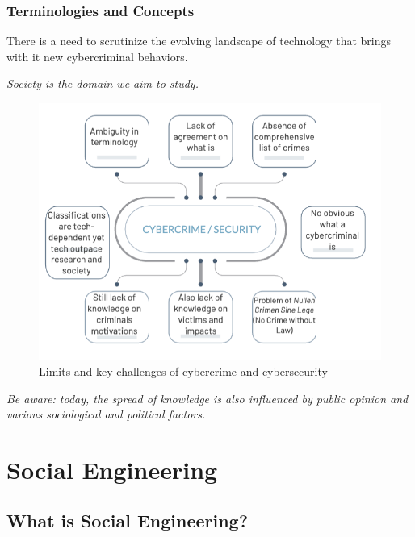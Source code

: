 \clearpage

\subsection{Terminologies and Concepts}

\raggedright
There is a need to scrutinize the evolving landscape of technology that brings with it new cybercriminal behaviors.

\raggedleft \textit{Society is the domain we aim to study.}

\begin{figure}[H]
    \includegraphics[width=\linewidth]{Images/Sociology/securityLimits.png}
    \caption{Limits and key challenges of cybercrime and cybersecurity}
    \label{fig:cyberLimits}
\end{figure}

\vspace{3cm}

\centering
\textit{Be aware: today, the spread of knowledge is also influenced by public opinion and various sociological and political factors.}
\raggedright

\clearpage

\chapter{Social Engineering}

\section*{What is Social Engineering?}

